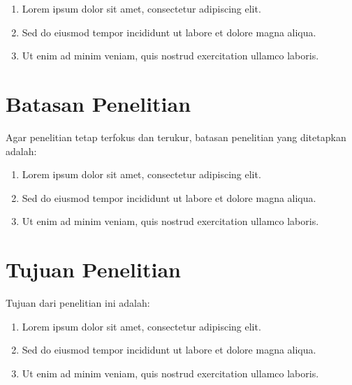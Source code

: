 \begin{enumerate}
  \item Lorem ipsum dolor sit amet, consectetur adipiscing elit.
  \item Sed do eiusmod tempor incididunt ut labore et dolore magna aliqua.
  \item Ut enim ad minim veniam, quis nostrud exercitation ullamco laboris.
\end{enumerate}

\section{Batasan Penelitian}


Agar penelitian tetap terfokus dan terukur, batasan penelitian yang ditetapkan adalah:

\begin{enumerate}
  \item Lorem ipsum dolor sit amet, consectetur adipiscing elit.
  \item Sed do eiusmod tempor incididunt ut labore et dolore magna aliqua.
  \item Ut enim ad minim veniam, quis nostrud exercitation ullamco laboris.
\end{enumerate}

\section{Tujuan Penelitian}


Tujuan dari penelitian ini adalah:

\begin{enumerate}
  \item Lorem ipsum dolor sit amet, consectetur adipiscing elit.
  \item Sed do eiusmod tempor incididunt ut labore et dolore magna aliqua.
  \item Ut enim ad minim veniam, quis nostrud exercitation ullamco laboris.
\end{enumerate}

